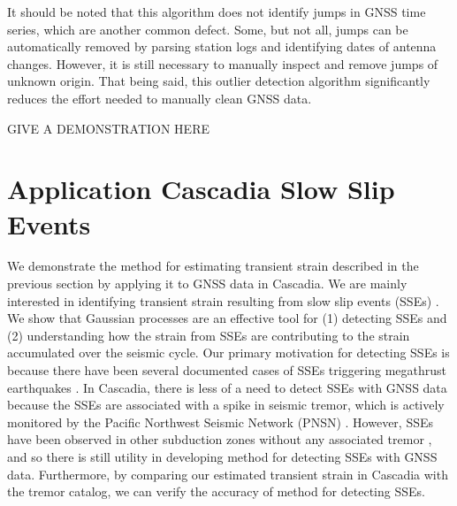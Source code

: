 \documentclass[10pt,a4paper]{article}
\begin{document}
It should be noted that this algorithm does not identify jumps in GNSS time series, which are another common defect. Some, but not all, jumps can be automatically removed by parsing station logs and identifying dates of antenna changes. However, it is still necessary to manually inspect and remove jumps of unknown origin. That being said, this outlier detection algorithm significantly reduces the effort needed to manually clean GNSS data.       

GIVE A DEMONSTRATION HERE

\section{Application Cascadia Slow Slip Events}\label{sec:Cascadia}
We demonstrate the method for estimating transient strain described in the previous section by applying it to GNSS data in Cascadia. We are mainly interested in identifying transient strain resulting from slow slip events (SSEs) \citep[e.g.,][]{Dragert2001}. We show that Gaussian processes are an effective tool for (1) detecting SSEs and (2) understanding how the strain from SSEs are contributing to the strain accumulated over the seismic cycle. Our primary motivation for detecting SSEs is because there have been several documented cases of SSEs triggering megathrust earthquakes \citep{Roeloffs2006}.  In Cascadia, there is less of a need to detect SSEs with GNSS data because the SSEs are associated with a spike in seismic tremor, which is actively monitored by the Pacific Northwest Seismic Network (PNSN) \citep{Wech2010}. However, SSEs have been observed in other subduction zones without any associated tremor \citep{Schwartz2007}, and so there is still utility in developing method for detecting SSEs with GNSS data. Furthermore, by comparing our estimated transient strain in Cascadia with the tremor catalog, we can verify the accuracy of method for detecting SSEs. 
\end{document}
